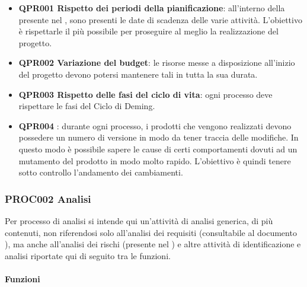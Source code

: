 		\begin{itemize} 
			\item \textbf{QPR001 Rispetto dei periodi della pianificazione}: all'interno della presente nel \PdPd, sono presenti le date di scadenza delle varie attività. L'obiettivo è rispettarle il più possibile per proseguire al meglio la realizzazione del progetto.
			\item \textbf{QPR002 Variazione del budget}: le risorse messe a disposizione all'inizio del progetto devono potersi mantenere tali in tutta la sua durata.
			\item \textbf{QPR003 Rispetto delle fasi del ciclo di vita}: ogni processo deve rispettare le fasi del Ciclo di Deming.
			\item \textbf{QPR004 }: durante ogni processo, i prodotti che vengono realizzati devono possedere un numero di versione in modo da tener traccia delle modifiche. In questo modo è possibile sapere le cause di certi comportamenti dovuti ad un mutamento del prodotto in modo molto rapido. L'obiettivo è quindi tenere sotto controllo l'andamento dei cambiamenti.
		\end{itemize}
	
	\subsubsection{PROC002 Analisi}
	Per processo di analisi si intende qui un'attività di analisi generica, di più contenuti, non riferendosi solo all'analisi dei requisiti (consultabile al documento \AdRd), ma anche all'analisi dei rischi (presente nel \PdPd) e altre attività di identificazione e analisi riportate qui di seguito tra le funzioni.
	
	
	
		\paragraph*{Funzioni}
		
